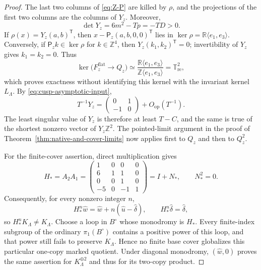 \documentclass[11pt]{article}
\numberwithin{equation}{section}
\theoremstyle{definition}
\theoremstyle{remark}
\newcommand{\R}{\mathbb R}
\newcommand{\Z}{\mathbb Z}
\newcommand{\T}{\mathbb T}
\begin{document}
\begin{proof}
The last two columns of \eqref{eq:Z-P} are killed by $\rho$, and the
projections of the first two columns are the columns of $Y_z$.  Moreover,
\[
 \det Y_z=6m^2-Tp=-TD>0.
\]
If $\rho(x)=Y_z(a,b)^{\mathsf T}$, then
$x-\mathsf P_z(a,b,0,0)^{\mathsf T}$ lies in
$\ker\rho=\R\langle e_1,e_3\rangle$.  Conversely, if
$\mathsf P_zk\in\ker\rho$ for $k\in\Z^4$, then
$Y_z(k_1,k_2)^{\mathsf T}=0$; invertibility of $Y_z$ gives $k_1=k_2=0$.
Thus
\[
 \ker\bigl(F_z^{\mathrm{flat}}\longrightarrow Q_z\bigr)
 \simeq
 \frac{\R\langle e_1,e_3\rangle}
      {\Z\langle e_1,e_3\rangle}
 =\T^2_{\mathrm{re}},
\]
which proves exactness without identifying this kernel with the invariant
kernel $L_\Lambda$.  By
\eqref{eq:cusp-asymptotic-input},
\[
 T^{-1}Y_z=
 \begin{pmatrix}0&1\\-1&0\end{pmatrix}+O_{\mathrm{op}}(T^{-1}).
\]
The least singular value of $Y_z$ is therefore at least $T-C$, and the same
is true of the shortest nonzero vector of $Y_z\Z^2$.  The pointed-limit
argument in the proof of Theorem~\ref{thm:native-and-cover-limits} now applies
first to $Q_z$ and then to $Q_z^2$.

For the finite-cover assertion, direct multiplication gives
\begin{equation}\label{eq:no-finite-cover-matrix}
 H_*=A_2A_1=
 \begin{pmatrix}
 1&0&0&0\\6&1&1&0\\0&0&1&0\\-5&0&-1&1
 \end{pmatrix}=I+N_*,\qquad N_*^2=0.
\end{equation}
Consequently, for every nonzero integer $n$,
\begin{equation}\label{eq:no-finite-cover-orbit}
 H_*^n\widehat w
 =\widehat w+n(\widehat u-\widehat\delta),
 \qquad H_*^n\widehat\delta=\widehat\delta,
\end{equation}
so $H_*^nK_\Lambda\ne K_\Lambda$.  Choose a loop in $B^\circ$ whose
monodromy is $H_*$.  Every finite-index subgroup of the ordinary
$\pi_1(B^\circ)$ contains a positive power of this loop, and that power still
fails to preserve $K_\Lambda$.  Hence no finite base cover globalizes this
particular one-copy marked quotient.  Under diagonal monodromy,
$(\widehat w,0)$ proves the same assertion for $K_\Lambda^{\oplus2}$ and thus
for its two-copy product.
\end{proof}
\end{document}
